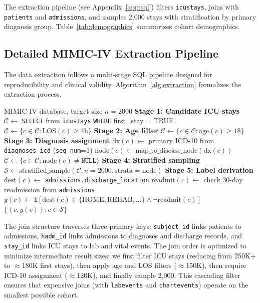 The extraction pipeline (see Appendix~\ref{app:sql}) filters \texttt{icustays}, joins with \texttt{patients} and \texttt{admissions}, and samples 2,000 stays with stratification by primary diagnosis group. Table~\ref{tab:demographics} summarizes cohort demographics.



\subsection{Detailed MIMIC-IV Extraction Pipeline}

The data extraction follows a multi-stage SQL pipeline designed for reproducibility and clinical validity. Algorithm~\ref{alg:extraction} formalizes the extraction process.

\begin{algorithm}[htbp]
\caption{MIMIC-IV Cohort Extraction Pipeline}
\label{alg:extraction}
\begin{algorithmic}[1]
\Require MIMIC-IV database, target size $n=2000$
\State \textbf{Stage 1: Candidate ICU stays}
\State $\mathcal{C} \gets$ \texttt{SELECT} from \texttt{icustays} \texttt{WHERE} first\_stay = TRUE
\State $\mathcal{C} \gets \{c \in \mathcal{C} : \text{LOS}(c) \geq 4\text{h}\}$
\State \textbf{Stage 2: Age filter}
\State $\mathcal{C} \gets \{c \in \mathcal{C} : \text{age}(c) \geq 18\}$ 
\State \textbf{Stage 3: Diagnosis assignment}
\State $\text{dx}(c) \gets$ primary ICD-10 from \texttt{diagnoses\_icd} (\texttt{seq\_num}=1)
\State $\text{node}(c) \gets \text{map\_to\_disease\_node}(\text{dx}(c))$
\EndFor
\State $\mathcal{C} \gets \{c \in \mathcal{C} : \text{node}(c) \neq \texttt{NULL}\}$
\State \textbf{Stage 4: Stratified sampling}
\State $\mathcal{S} \gets \text{stratified\_sample}(\mathcal{C}, n=2000, \text{strata}=\text{node})$
\State \textbf{Stage 5: Label derivation}
\State $\text{dest}(c) \gets$ \texttt{admissions.discharge\_location}
\State $\text{readmit}(c) \gets$ check 30-day readmission from \texttt{admissions}
\State $y(c) \gets \mathbb{1}[\text{dest}(c) \in \{\text{HOME}, \text{REHAB}, \ldots\} \land \neg\text{readmit}(c)]$
\EndFor
\State \Return $\{(c, y(c)) : c \in \mathcal{S}\}$
\end{algorithmic}
\end{algorithm}

The join structure traverses three primary keys: \texttt{subject\_id} links patients to admissions, \texttt{hadm\_id} links admissions to diagnoses and discharge records, and \texttt{stay\_id} links ICU stays to lab and vital events. The join order is optimized to minimize intermediate result sizes: we first filter ICU stays (reducing from 250K+ to $\approx$180K first stays), then apply age and LOS filters ($\approx$150K), then require ICD-10 assignment ($\approx$120K), and finally sample 2,000. This cascading filter ensures that expensive joins (with \texttt{labevents} and \texttt{chartevents}) operate on the smallest possible cohort.

